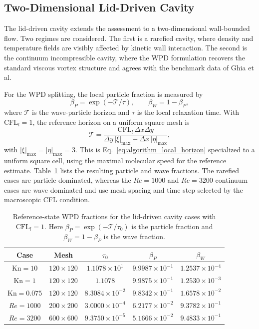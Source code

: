 \documentclass[preprint,12pt]{elsarticle}
\begin{document}
\subsection{Two-Dimensional Lid-Driven Cavity}

The lid-driven cavity extends the assessment to a two-dimensional wall-bounded flow. Two regimes are considered. The first is a rarefied cavity, where density and temperature fields are visibly affected by kinetic wall interaction. The second is the continuum incompressible cavity, where the WPD formulation recovers the standard viscous vortex structure and agrees with the benchmark data of Ghia et al.

For the WPD splitting, the local particle fraction is measured by
\[
\beta_P=\exp(-\mathcal{T}/\tau),\qquad \beta_W=1-\beta_P,
\]
where \(\mathcal{T}\) is the wave-particle horizon and \(\tau\) is the local relaxation time. With \(\mathrm{CFL}_l=1\), the reference horizon on a uniform square mesh is
\[
\mathcal{T} = \frac{\mathrm{CFL}_l\,\Delta x\Delta y}{\Delta y\,|\xi|_{\max}+\Delta x\,|\eta|_{\max}},
\]
with \(|\xi|_{\max}=|\eta|_{\max}=3\). This is Eq.~\eqref{eq:algorithm_local_horizon} specialized to a uniform square cell, using the maximal molecular speed for the reference estimate. Table~\ref{tab:cavity_wp_fraction} lists the resulting particle and wave fractions. The rarefied cases are particle dominated, whereas the \(Re=1000\) and \(Re=3200\) continuum cases are wave dominated and use mesh spacing and time step selected by the macroscopic CFL condition.

\begin{table}[!htbp]
\centering
\caption{Reference-state WPD fractions for the lid-driven cavity cases with \(\mathrm{CFL}_l=1\). Here \(\beta_P=\exp(-\mathcal{T}/\tau_0)\) is the particle fraction and \(\beta_W=1-\beta_P\) is the wave fraction.}
\label{tab:cavity_wp_fraction}
\begin{tabular}{ccccc}
\toprule
Case & Mesh & \(\tau_0\) & \(\beta_P\) & \(\beta_W\) \\
\midrule
\(\mathrm{Kn}=10\) & \(120\times120\) & \(1.1078\times10^{1}\) & \(9.9987\times10^{-1}\) & \(1.2537\times10^{-4}\) \\
\(\mathrm{Kn}=1\) & \(120\times120\) & \(1.1078\) & \(9.9875\times10^{-1}\) & \(1.2530\times10^{-3}\) \\
\(\mathrm{Kn}=0.075\) & \(120\times120\) & \(8.3084\times10^{-2}\) & \(9.8342\times10^{-1}\) & \(1.6578\times10^{-2}\) \\
\(Re=1000\) & \(200\times200\) & \(3.0000\times10^{-4}\) & \(6.2177\times10^{-2}\) & \(9.3782\times10^{-1}\) \\
\(Re=3200\) & \(600\times600\) & \(9.3750\times10^{-5}\) & \(5.1666\times10^{-2}\) & \(9.4833\times10^{-1}\) \\
\bottomrule
\end{tabular}
\end{table}
\end{document}
